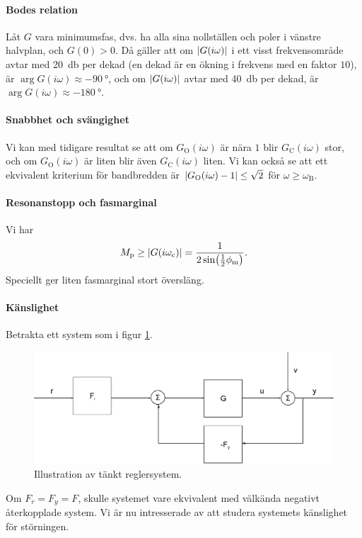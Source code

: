 \paragraph{Bodes relation}
Låt $G$ vara minimumsfas, dvs. ha alla sina nollställen och poler i vänstre halvplan, och $G(0) > 0$. Då gäller att om $\abs{G(i\omega)}$ i ett visst frekvensområde avtar med \SI{20}{\decibel} per dekad (en dekad är en ökning i frekvens med en faktor $10$), är $\arg{G(i\omega)}\approx \SI{-90}{\degree}$, och om $\abs{G(i\omega)}$ avtar med \SI{40}{\decibel} per dekad, är $\arg{G(i\omega)}\approx \SI{-180}{\degree}$.

\paragraph{Snabbhet och svängighet}
Vi kan med tidigare resultat se att om $G_{\text{O}}(i\omega)$ är nära $1$ blir $G_{\text{C}}(i\omega)$ stor, och om $G_{\text{O}}(i\omega)$ är liten blir även $G_{\text{C}}(i\omega)$ liten. Vi kan också se att ett ekvivalent kriterium för bandbredden är $\abs{G_{\text{O}}(i\omega) - 1} \leq \sqrt{2}$ för $\omega \geq \omega_{\text{B}}$.

\paragraph{Resonanstopp och fasmarginal}
Vi har
\begin{align*}
	M_{\text{p}} \geq \abs{G(i\omega_{\text{c}})} = \frac{1}{2\sin(\frac{1}{2}\phi_{\text{m}})}.
\end{align*}
Speciellt ger liten fasmarginal stort översläng.

\paragraph{Känslighet}
Betrakta ett system som i figur \ref{fig:negative_feedback_equiv}.
\begin{figure}[!ht]
	\centering
	\includegraphics[width = \textwidth]{./Images/negative_feedback_equiv.eps}
	\caption{Illustration av tänkt reglersystem.}
	\label{fig:negative_feedback_equiv}
\end{figure}
Om $F_{r} = F_{y} = F$, skulle systemet vare ekvivalent med välkända negativt återkopplade system. Vi är nu intresserade av att studera systemets känslighet för störningen.

